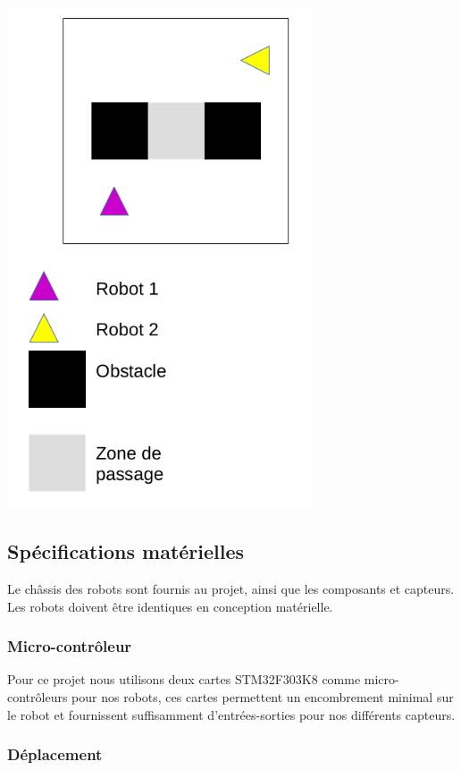 \documentclass{article}
\begin{document}
\begin{center}
  \includegraphics[width=9cm]{epreuve.png}
\end{center}

\subsection{Spécifications matérielles}

Le châssis des robots sont fournis au projet, ainsi que les composants et capteurs. Les robots doivent être identiques en conception matérielle.

\subsubsection{Micro-contrôleur}

Pour ce projet nous utilisons deux cartes STM32F303K8 comme micro-contrôleurs pour nos robots, ces cartes permettent un encombrement minimal sur le robot et fournissent suffisamment d’entrées-sorties pour nos différents capteurs.

\subsubsection{Déplacement}
\end{document}
